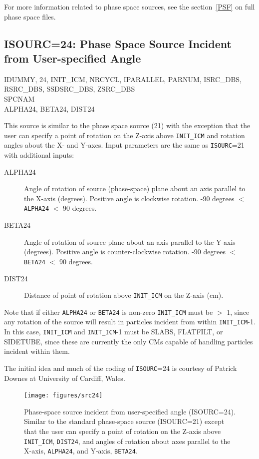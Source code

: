 \documentclass[12pt,twoside]{article}
\newcommand{\cen}[1]{\begin{center} #1 \end{center}                   }
\begin{document}
For more information related to phase space sources, see the
section~\ref{PSF} on full phase space files.

\clearpage
\subsection{ISOURC=24: Phase Space Source Incident from User-specified Angle}
\label{Source24}

\cen{IDUMMY, 24, INIT\_ICM, NRCYCL, IPARALLEL, PARNUM, ISRC\_DBS,
RSRC\_DBS, SSDSRC\_DBS, ZSRC\_DBS \\SPCNAM \\ALPHA24, BETA24, DIST24}

This source is similar to the phase space source (21) with the exception that the
user can specify a point of rotation on the Z-axis above {\tt INIT\_ICM} and rotation
angles about the X- and Y-axes.  Input parameters are the same as {\tt ISOURC}=21 with
additional inputs:
\begin{description}
\item [ALPHA24] Angle of rotation of source (phase-space) plane about an axis
parallel to the X-axis (degrees).
Positive angle is clockwise rotation. -90 degrees $<$ {\tt ALPHA24} $<$ 90 degrees.
\item [BETA24] Angle of rotation of source plane about an axis parallel to the Y-axis (degrees).  Positive angle
is counter-clockwise rotation. -90 degrees $<$ {\tt BETA24} $<$ 90 degrees.
\item [DIST24] Distance of point of rotation above {\tt INIT\_ICM} on the Z-axis (cm).
\end{description}

Note that if either {\tt ALPHA24} or {\tt BETA24} is non-zero {\tt INIT\_ICM} must be $>$ 1,
since any rotation of the source
will result in particles incident from within {\tt INIT\_ICM}-1.  In this case, {\tt INIT\_ICM}
and {\tt INIT\_ICM}-1 must be SLABS, FLATFILT, or SIDETUBE, since these are currently the
only CMs capable of handling particles incident within them.

The initial idea and much of the coding of {\tt ISOURC}=24 is courtesy of Patrick
Downes at University of Cardiff, Wales.

\begin{figure}[H]
\vspace*{-0.4cm}
\begin{center}
\leavevmode
\texttt{[image: figures/src24]}
\caption[ISOURC=24: Phase-space Source Incident from User-specified Angle]
{Phase-space source incident from user-specified angle (ISOURC=24).  Similar to
the standard phase-space source (ISOURC=21) except that the user can specify
a point of rotation on the Z-axis above {\tt INIT\_ICM}, {\tt DIST24}, and
angles of rotation about axes parallel to the X-axis, {\tt ALPHA24}, and
Y-axis, {\tt BETA24}.}
\label{fig_src24}
\end{center}
\end{figure}
\end{document}
